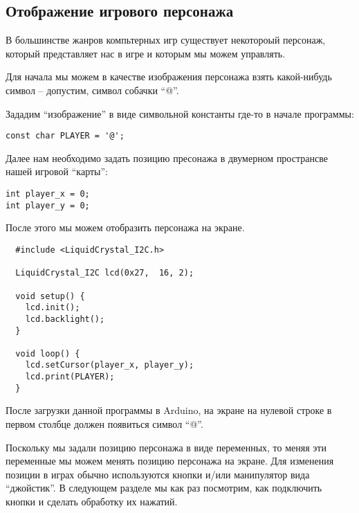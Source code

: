 \subsection{Отображение игрового персонажа}

В большинстве жанров компьтерных игр существует некотороый персонаж, который
представляет нас в игре и которым мы можем управлять.

Для начала мы можем в качестве изображения персонажа взять какой-нибудь символ
-- допустим, символ собачки ``@''.

Зададим ``изображение'' в виде символьной константы где-то в начале программы:

\begin{verbatim}
const char PLAYER = '@';
\end{verbatim}

Далее нам необходимо задать позицию пресонажа в двумерном пространсве нашей
игровой ``карты'':

\begin{verbatim}
int player_x = 0;
int player_y = 0;
\end{verbatim}

После этого мы можем отобразить персонажа на экране.

\begin{verbatim}
  #include <LiquidCrystal_I2C.h>

  LiquidCrystal_I2C lcd(0x27,  16, 2);

  void setup() {
    lcd.init();
    lcd.backlight();
  }

  void loop() {
    lcd.setCursor(player_x, player_y);
    lcd.print(PLAYER);
  }
\end{verbatim}

После загрузки данной программы в Arduino, на экране на нулевой строке в первом
столбце должен появиться символ ``@''.

Поскольку мы задали позицию персонажа в виде переменных, то меняя эти переменные
мы можем менять позицию персонажа на экране.  Для изменения позиции в играх
обычно используются кнопки и/или манипулятор вида ``джойстик''.  В следующем
разделе мы как раз посмотрим, как подключить кнопки и сделать обработку их
нажатий.
